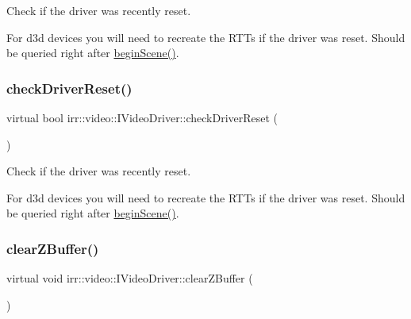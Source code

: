 Check if the driver was recently reset. 

For d3d devices you will need to recreate the R\+T\+Ts if the driver was reset. Should be queried right after \hyperlink{classirr_1_1video_1_1IVideoDriver_a015b8f2f18c260a00a858181be1e9945}{begin\+Scene()}. \mbox{\label{classirr_1_1video_1_1IVideoDriver_a4ba84ee992939fc913d4935caffce87b}} 
\subsubsection{\texorpdfstring{check\+Driver\+Reset()}{checkDriverReset()}\hspace{0.1cm}{\footnotesize\ttfamily [2/2]}}
{\footnotesize\ttfamily virtual bool irr\+::video\+::\+I\+Video\+Driver\+::check\+Driver\+Reset (\begin{DoxyParamCaption}{ }\end{DoxyParamCaption})\hspace{0.3cm}{\ttfamily [pure virtual]}}



Check if the driver was recently reset. 

For d3d devices you will need to recreate the R\+T\+Ts if the driver was reset. Should be queried right after \hyperlink{classirr_1_1video_1_1IVideoDriver_a015b8f2f18c260a00a858181be1e9945}{begin\+Scene()}. \mbox{\label{classirr_1_1video_1_1IVideoDriver_a2036fe0a27dbd1a123ff5aedb07373a5}} 
\subsubsection{\texorpdfstring{clear\+Z\+Buffer()}{clearZBuffer()}\hspace{0.1cm}{\footnotesize\ttfamily [1/2]}}
{\footnotesize\ttfamily virtual void irr\+::video\+::\+I\+Video\+Driver\+::clear\+Z\+Buffer (\begin{DoxyParamCaption}{ }\end{DoxyParamCaption})\hspace{0.3cm}{\ttfamily [pure virtual]}}



